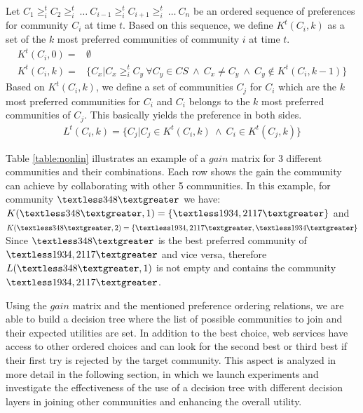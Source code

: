 \documentclass[11pt,onecolumn]{IEEEtran}
\begin{document}
Let $C_1 \geq_{i}^t C_2 \geq_{i}^t ~\dots~ C_{i-1} \geq_{i}^t C_{i+1} \geq_{i}^t ~\dots~ C_n$ be an ordered sequence of preferences for community $C_i$ at time $t$. Based on this sequence, we define $K^t(C_i, k)$ as a set of the $k$ most preferred communities of community $i$ at time $t$.
\begin{equation}\label{h_t_pref_top}
\begin{split}				
K^t(C_i, 0) = &\emptyset \\
K^t(C_i, k) = &\Big\{C_x | C_x \geq_{i}^t C_y ~\forall C_y \in CS ~\wedge~ C_x \neq C_y ~\wedge~ C_y \notin K^t(C_i, k-1) \Big\}				
\end{split}
\end{equation}
Based on $K^t(C_i, k)$, we define a set of communities $C_j$ for $C_i$ which are the $k$ most preferred communities for $C_i$ and $C_i$ belongs to the $k$ most preferred communities of $C_j$. This basically yields the preference in both sides.
\begin{equation}\label{l_t_top_both}
\begin{split}	
L^t(C_i,k) = \Big\{C_j | C_j \in K^t(C_i, k)~ \wedge~ C_i \in K^t(C_j, k)\Big\}
\end{split}
\end{equation}

Table \ref{table:nonlin} illustrates an example of a $gain$ matrix for 3 different communities and their combinations. Each row shows the gain the community can achieve by collaborating with other 5 communities. In this example, for community $\textless 348 \textgreater$ we have: \\
$K(\textless 348 \textgreater, 1) = \{\textless1934, 2117\textgreater\}$ and \\
$K(\textless 348 \textgreater, 2) = \{\textless1934, 2117\textgreater, \textless1934\textgreater\}$ \\
Since $\textless 348 \textgreater$ is the best preferred community of $\textless 1934, 2117 \textgreater$ and vice versa, therefore $L(\textless 348 \textgreater, 1)$ is not empty and contains the community $\textless1934, 2117\textgreater$.

Using the $gain$ matrix and the mentioned preference ordering relations, we are able to build a decision tree where the list of possible communities to join and their expected utilities are set.
In addition to the best choice, web services have access to other ordered choices and can look for the second best or third best if their first try is rejected by the target community. This aspect is analyzed in more detail in the following section, in which we launch experiments and investigate the effectiveness of the use of a decision tree with different decision layers in joining other communities and enhancing the overall utility. 
\end{document}

